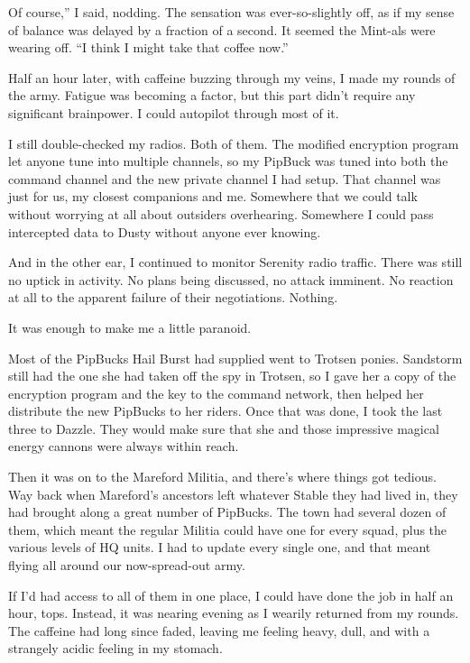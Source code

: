 \leavevmode{}Of course,” I said, nodding. The sensation was ever-so-slightly off, as if my sense of balance was delayed by a fraction of a second. It seemed the Mint-als were wearing off. “I think I might take that coffee now.”

{\br}%
Half an hour later, with caffeine buzzing through my veins, I made my rounds of the army. Fatigue was becoming a factor, but this part didn’t require any significant brainpower. I could autopilot through most of it.

I still double-checked my radios. Both of them. The modified encryption program let anyone tune into multiple channels, so my PipBuck was tuned into both the command channel and the new private channel I had setup. That channel was just for us, my closest companions and me. Somewhere that we could talk without worrying at all about outsiders overhearing. Somewhere I could pass intercepted data to Dusty without anyone ever knowing.

And in the other ear, I continued to monitor Serenity radio traffic. There was still no uptick in activity. No plans being discussed, no attack imminent. No reaction at all to the apparent failure of their negotiations. Nothing.

It was enough to make me a little paranoid.

Most of the PipBucks Hail Burst had supplied went to Trotsen ponies. Sandstorm still had the one she had taken off the spy in Trotsen, so I gave her a copy of the encryption program and the key to the command network, then helped her distribute the new PipBucks to her riders. Once that was done, I took the last three to Dazzle. They would make sure that she and those impressive magical energy cannons were always within reach.

Then it was on to the Mareford Militia, and there’s where things got tedious. Way back when Mareford’s ancestors left whatever Stable they had lived in, they had brought along a great number of PipBucks. The town had several dozen of them, which meant the regular Militia could have one for every squad, plus the various levels of HQ units. I had to update every single one, and that meant flying all around our now-spread-out army.

If I’d had access to all of them in one place, I could have done the job in half an hour, tops. Instead, it was nearing evening as I wearily returned from my rounds. The caffeine had long since faded, leaving me feeling heavy, dull, and with a strangely acidic feeling in my stomach.

